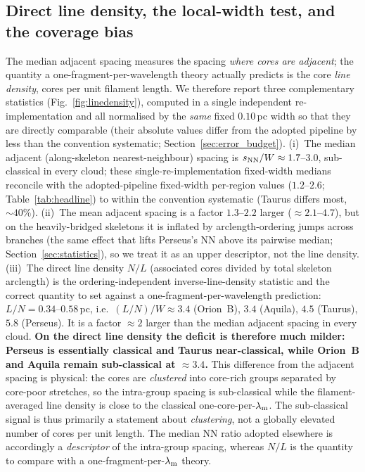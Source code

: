 \documentclass[usenatbib,twoside,twocolumn]{mnras}
\begin{document}
\subsection{Direct line density, the local-width test, and the coverage bias}
\label{sec:linedensity}
The median adjacent spacing measures the spacing \emph{where cores are adjacent}; the quantity a one-fragment-per-wavelength theory actually predicts is the core \emph{line density}, cores per unit filament length. We therefore report three complementary statistics (Fig.~\ref{fig:linedensity}), computed in a single independent re-implementation and all normalised by the \emph{same} fixed $0.10$\,pc width so that they are directly comparable (their absolute values differ from the adopted pipeline by less than the convention systematic; Section~\ref{sec:error_budget}). (i)~The median adjacent (along-skeleton nearest-neighbour) spacing is $s_{\rm NN}/W\approx1.7$--$3.0$, sub-classical in every cloud; these single-re-implementation fixed-width medians reconcile with the adopted-pipeline fixed-width per-region values ($1.2$--$2.6$; Table~\ref{tab:headline}) to within the convention systematic (Taurus differs most, $\sim40\%$). (ii)~The mean adjacent spacing is a factor $1.3$--$2.2$ larger ($\approx2.1$--$4.7$), but on the heavily-bridged skeletons it is inflated by arclength-ordering jumps across branches (the same effect that lifts Perseus's NN above its pairwise median; Section~\ref{sec:statistics}), so we treat it as an upper descriptor, not the line density. (iii)~The direct line density $N/L$ (associated cores divided by total skeleton arclength) is the ordering-independent inverse-line-density statistic and the correct quantity to set against a one-fragment-per-wavelength prediction: $L/N=0.34$--$0.58$\,pc, i.e.\ $(L/N)/W\approx3.4$ (Orion~B), $3.4$ (Aquila), $4.5$ (Taurus), $5.8$ (Perseus). It is a factor $\approx2$ larger than the median adjacent spacing in every cloud. \textbf{On the direct line density the deficit is therefore much milder: Perseus is essentially classical and Taurus near-classical, while Orion~B and Aquila remain sub-classical at $\approx3.4$.} This difference from the adjacent spacing is physical: the cores are \emph{clustered} into core-rich groups separated by core-poor stretches, so the intra-group spacing is sub-classical while the filament-averaged line density is close to the classical one-core-per-$\lambda_{\rm m}$. The sub-classical signal is thus primarily a statement about \emph{clustering}, not a globally elevated number of cores per unit length. The median NN ratio adopted elsewhere is accordingly a \emph{descriptor} of the intra-group spacing, whereas $N/L$ is the quantity to compare with a one-fragment-per-$\lambda_{\rm m}$ theory.
\end{document}
